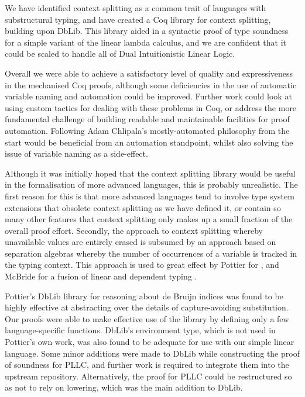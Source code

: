 \documentclass[]{unswthesis}
\newcommand{\SSPHS}{\text{SSPHS }}
\begin{document}
We have identified context splitting as a common trait of languages with substructural typing, and have created a Coq library for context splitting, building upon DbLib. This library aided in a syntactic proof of type soundness for a simple variant of the linear lambda calculus, and we are confident that it could be scaled to handle all of Dual Intuitionistic Linear Logic.

Overall we were able to achieve a satisfactory level of quality and expressiveness in the mechanised Coq proofs, although some deficiencies in the use of automatic variable naming and automation could be improved. Further work could look at using custom tactics for dealing with these problems in Coq, or address the more fundamental challenge of building readable and maintainable facilities for proof automation. Following Adam Chlipala's mostly-automated philosophy from the start would be beneficial from an automation standpoint, whilst also solving the issue of variable naming as a side-effect.

Although it was initially hoped that the context splitting library would be useful in the formalisation of more advanced languages, this is probably unrealistic. The first reason for this is that more advanced languages tend to involve type system extensions that obsolete context splitting as we have defined it, or contain so many other features that context splitting only makes up a small fraction of the overall proof effort. Secondly, the approach to context splitting whereby unavailable values are entirely erased is subsumed by an approach based on separation algebras whereby the number of occurrences of a variable is tracked in the typing context. This approach is used to great effect by Pottier for \SSPHS \cite{pottier13}, and McBride for a fusion of linear and dependent typing \cite{mcbride16}.

Pottier's DbLib library for reasoning about de Bruijn indices was found to be highly effective at abstracting over the details of capture-avoiding substitution. Our proofs were able to make effective use of the library by defining only a few language-specific functions. DbLib's environment type, which is not used in Pottier's own work, was also found to be adequate for use with our simple linear language. Some minor additions were made to DbLib while constructing the proof of soundness for PLLC, and further work is required to integrate them into the upstream repository. Alternatively, the proof for PLLC could be restructured so as not to rely on lowering, which was the main addition to DbLib.
\end{document}
